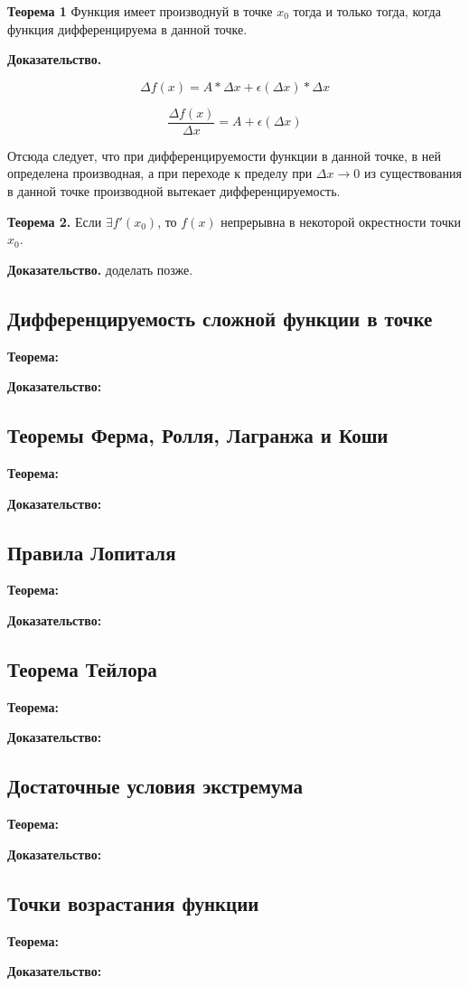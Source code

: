\documentclass{article}
\begin{document}
\textbf{Теорема 1} Функция имеет производнуй в точке $x_0$ тогда и только тогда, когда функция дифференцируема в данной точке.

\textbf{Доказательство.}

\[ \Delta f(x) = A*\Delta x + \epsilon(\Delta x)*\Delta x \]

\[ \frac{\Delta f(x)}{\Delta x} = A + \epsilon(\Delta x) \]

Отсюда следует, что при дифференцируемости функции в данной точке, в ней определена производная, а при переходе к пределу при $\Delta x \rightarrow 0$ из существования в данной точке производной вытекает дифференцируемость. 

\textbf{Теорема 2.} Если $\exists f'(x_0)$, то $f(x)$ непрерывна в некоторой окрестности точки $x_0$.

\textbf{Доказательство.} доделать позже.

\subsection{Дифференцируемость сложной функции в точке}

\textbf{Теорема:}

\textbf{Доказательство:}

\subsection{Теоремы Ферма, Ролля, Лагранжа и Коши}

\textbf{Теорема:}

\textbf{Доказательство:}

\subsection{Правила Лопиталя}

\textbf{Теорема:}

\textbf{Доказательство:}

\subsection{Теорема Тейлора}

\textbf{Теорема:}

\textbf{Доказательство:}

\subsection{Достаточные условия экстремума}

\textbf{Теорема:}

\textbf{Доказательство:}

\subsection{Точки возрастания функции}

\textbf{Теорема:}

\textbf{Доказательство:}
\end{document}

